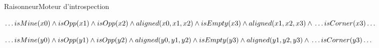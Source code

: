 \begin{frame}{Raisonneur}{Moteur d'introspection}
	\begin{minipage}{0.45\textwidth}
			$\ldots isMine(x0) \wedge \\ 
			isOpp(x1) \wedge \\
			isOpp(x2) \wedge \\
			aligned(x0,x1,x2) \wedge \\
			isEmpty(x3) \wedge \\
			aligned (x1,x2,x3) \wedge \\
			\ldots isCorner(x3) \ldots$
	\end{minipage}
	\begin{minipage}{0.45\textwidth}
			$\ldots isMine(y0) \wedge \\
			isOpp(y1) \wedge \\
			isOpp(y2) \wedge \\
			aligned(y0,y1,y2) \wedge \\
			isEmpty(y3) \wedge \\
			aligned (y1,y2,y3) \wedge \\
			\ldots isCorner(y3) \ldots$
	\end{minipage}
\end{frame}
